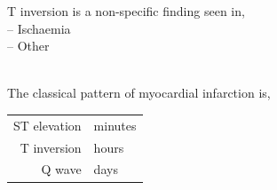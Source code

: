 \documentclass[11pt,a4paper]{report}
\begin{document}
\noindent T inversion is a non-specific finding seen in, \\
-- Ischaemia \\
-- Other  

~\\
\noindent The classical pattern of myocardial infarction is, 
\begin{center}
	\begin{tabular}{r|l} 
		\toprule[1.5pt]
		ST elevation 	& minutes \\
		T inversion 	& hours \\
		Q wave 			& days \\
		\bottomrule[1.5pt]
	\end{tabular}
\end{center}
\end{document}
